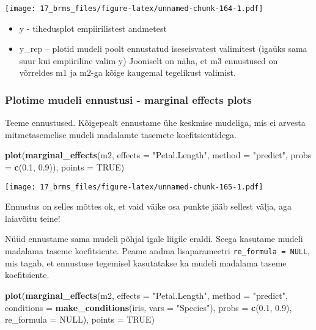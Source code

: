 \documentclass[]{article}
\newenvironment{Shaded}{\begin{snugshade}}{\end{snugshade}}
\newcommand{\KeywordTok}[1]{\textcolor[rgb]{0.13,0.29,0.53}{\textbf{#1}}}
\newcommand{\DataTypeTok}[1]{\textcolor[rgb]{0.13,0.29,0.53}{#1}}
\newcommand{\FloatTok}[1]{\textcolor[rgb]{0.00,0.00,0.81}{#1}}
\newcommand{\StringTok}[1]{\textcolor[rgb]{0.31,0.60,0.02}{#1}}
\newcommand{\OtherTok}[1]{\textcolor[rgb]{0.56,0.35,0.01}{#1}}
\newcommand{\NormalTok}[1]{#1}
\providecommand{\tightlist}{%
  \setlength{\itemsep}{0pt}\setlength{\parskip}{0pt}}
\begin{document}
\texttt{[image: 17\_brms\_files/figure-latex/unnamed-chunk-164-1.pdf]}

\begin{itemize}
\tightlist
\item
  y - tihedusplot empiirilistest andmetest
\item
  y\_rep -- plotid mudeli poolt ennustatud iseseisvatest valimitest
  (igaüks sama suur kui empiiriline valim y) Jooniselt on näha, et m3
  ennustused on võrreldes m1 ja m2-ga kõige kaugemal tegelikust
  valimist.
\end{itemize}

\subsubsection{Plotime mudeli ennustusi - marginal effects
plots}\label{plotime-mudeli-ennustusi---marginal-effects-plots}

Teeme ennustused. Kõigepealt ennustame ühe keskmise mudeliga, mis ei
arvesta mitmetasemelise mudeli madalamte tasemete koefitsientidega.

\begin{Shaded}
\begin{Highlighting}[]
\KeywordTok{plot}\NormalTok{(}\KeywordTok{marginal_effects}\NormalTok{(m2, }\DataTypeTok{effects =} \StringTok{"Petal.Length"}\NormalTok{, }\DataTypeTok{method =} \StringTok{"predict"}\NormalTok{, }\DataTypeTok{probs =} \KeywordTok{c}\NormalTok{(}\FloatTok{0.1}\NormalTok{, }\FloatTok{0.9}\NormalTok{)), }\DataTypeTok{points =} \OtherTok{TRUE}\NormalTok{)}
\end{Highlighting}
\end{Shaded}

\texttt{[image: 17\_brms\_files/figure-latex/unnamed-chunk-165-1.pdf]}

Ennustus on selles mõttes ok, et vaid väike osa punkte jääb sellest
välja, aga laiavõitu teine!

Nüüd ennustame sama mudeli põhjal igale liigile eraldi. Seega kasutame
mudeli madalama taseme koefitsiente. Peame andma lisaparameetri
\texttt{re\_formula\ =\ NULL}, mis tagab, et ennustuse tegemisel
kasutatakse ka mudeli madalama taseme koefitsiente.

\begin{Shaded}
\begin{Highlighting}[]
\KeywordTok{plot}\NormalTok{(}\KeywordTok{marginal_effects}\NormalTok{(m2, }\DataTypeTok{effects =} \StringTok{"Petal.Length"}\NormalTok{, }\DataTypeTok{method =} \StringTok{"predict"}\NormalTok{, }\DataTypeTok{conditions =} \KeywordTok{make_conditions}\NormalTok{(iris, }\DataTypeTok{vars =} \StringTok{"Species"}\NormalTok{), }\DataTypeTok{probs =} \KeywordTok{c}\NormalTok{(}\FloatTok{0.1}\NormalTok{, }\FloatTok{0.9}\NormalTok{), }\DataTypeTok{re_formula =} \OtherTok{NULL}\NormalTok{), }\DataTypeTok{points =} \OtherTok{TRUE}\NormalTok{)}
\end{Highlighting}
\end{Shaded}
\end{document}
